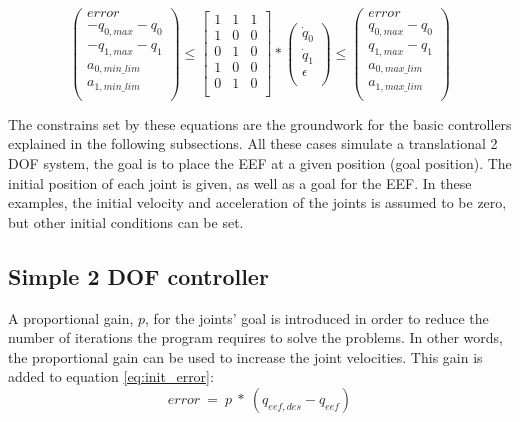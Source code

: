 \begin{equation}
\left( \begin{array}{c}
error \\
-q_{0,max} - q_{0} \\
-q_{1,max} - q_{1} \\
a_{0,min\_lim} \\
a_{1,min\_lim} \\
\end{array}
\right)	\leq 
\left[ \begin{array}{cccc}
1 & 1 & 1 \\
1 & 0 & 0 \\
0 & 1 & 0 \\
1 & 0 & 0 \\
0 & 1 & 0 \\
\end{array}
\right] *
\left( \begin{array}{c}
\dot{q}_{0} \\
\dot{q}_{1} \\
\epsilon \\
\end{array}
\right) 
\leq \left( \begin{array}{c}
error \\
q_{0,max} - q_{0} \\
q_{1,max} - q_{1} \\
a_{0,max\_lim} \\
a_{1,max\_lim} \\
\end{array}
\right)
\label{eq:a_constr}
\end{equation}

The constrains set by these equations are the groundwork for the basic controllers explained in the following subsections. All these cases simulate a translational 2 DOF system, the goal is to place the EEF at a given position (goal position). The initial position of each joint is given, as well as a goal for the EEF. In these examples, the initial velocity and acceleration of the joints is assumed to be zero, but other initial conditions can be set.

\subsection{Simple 2 DOF controller}
A proportional gain, $p$, for the joints' goal is introduced in order to reduce the number of iterations the program requires to solve the problems. In other words, the proportional gain can be used to increase the joint velocities. This gain is added to equation \ref{eq:init_error}:
\begin{equation}
error\ =\ p\ *\ \left(q_{eef,des} - q_{eef}\right)
\end{equation}


